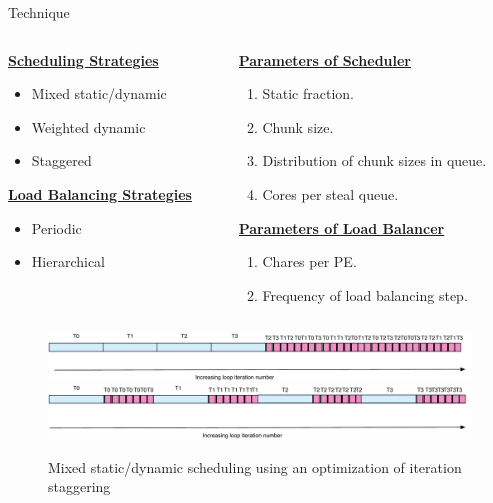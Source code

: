 \begin{frame}{Technique} 

\begin{columns}
\begin{column}{0.5\columnwidth}
{\scriptsize \underline{\textbf{Scheduling Strategies}}}
 \begin{itemize}
 \tiny \item \tiny Mixed static/dynamic
 \item \tiny Weighted dynamic
 \item \tiny Staggered
 \end{itemize}
{\scriptsize \underline{\textbf{Load Balancing Strategies}}}\\
\begin{itemize}
\tiny \item \tiny Periodic
\item \tiny Hierarchical
\end{itemize}
\end{column}


\begin{column}{0.5\columnwidth} 
{\scriptsize \underline{\textbf{Parameters of Scheduler}}}\\
\begin{enumerate}
\tiny \item \tiny Static fraction.
     \item \tiny Chunk size.
     \item \tiny Distribution of chunk sizes in queue.
     \item \tiny Cores per steal queue.
\end{enumerate}
{\scriptsize \underline{\textbf{Parameters of Load Balancer}}}\\
\begin{enumerate}
 \tiny \item \tiny Chares per PE.
 \item \tiny Frequency of load balancing step.
\end{enumerate}  
\end{column}
\end{columns}
         \begin{figure}[ht!]
           \label{fig:charm++locopthybsched}
           \begin{center}
             \includegraphics[scale=0.2]{./images/sdIncrIters}\\
             \includegraphics[scale=0.2]{./images/sdsIncrIters}
           \end{center}
           \vspace*{-0.1in}
           \caption{\label{fig:charm++locopthybsched} \tiny Mixed static/dynamic scheduling using an optimization of iteration staggering}
         \end{figure} 
         

\end{frame}

